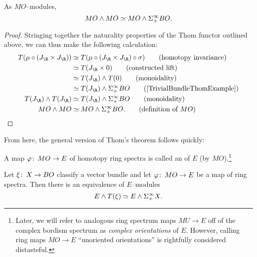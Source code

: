 \begin{lemma}
As \(MO\)--modules, \[MO \wedge MO \simeq MO \wedge \Sigma^\infty_+ BO.\]
\end{lemma}
\begin{proof}
Stringing together the naturality properties of the Thom functor outlined above, we can thus make the following calculation:
\begin{align*}
T(\mu \circ (J_{\R} \times J_{\R})) & \simeq T(\mu \circ (J_{\R} \times J_{\R}) \circ \sigma) \tag{homotopy invariance} \\
& \simeq T(J_{\R} \times 0) \tag{constructed lift} \\
& \simeq T(J_{\R}) \sm T(0) \tag{monoidality} \\
& \simeq T(J_{\R}) \sm \Susp^\infty_+ BO \tag{\Cref{TrivialBundleThomExample}} \\
T(J_{\R}) \sm T(J_{\R}) & \simeq T(J_{\R}) \sm \Susp^\infty_+ BO \tag{monoidality} \\
MO \sm MO & \simeq MO \sm \Susp^\infty_+ BO. \tag{definition of \(MO\)}
\end{align*}
\end{proof}

\noindent From here, the general version of Thom's theorem follows quickly:

\begin{definition}
A map \(\varphi\colon\thinspace MO \to E\) of homotopy ring spectra is called an  of \(E\) (by \(MO\)).\footnote{Later, we will refer to analogous ring spectrum maps \(MU \to E\) off of the complex bordism spectrum as \textit{complex orientations} of \(E\).  However, calling ring maps \(MO \to E\) ``unoriented orientations'' is rightfully considered distasteful.}
\end{definition}

\begin{theorem}\label{GeneralThomIsom}
Let \(\xi\colon\thinspace X \to BO\) classify a vector bundle and let \(\varphi\colon\thinspace MO \to E\) be a map of ring spectra. Then there is an equivalence of \(E\)--modules \[E \wedge T(\xi) \simeq E \wedge \Sigma^\infty_+ X.\]
\end{theorem}

